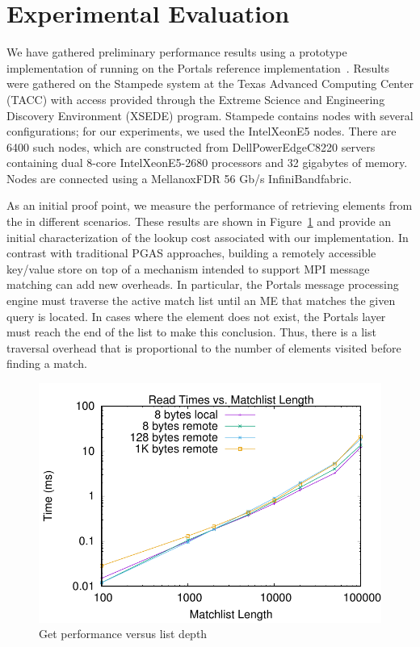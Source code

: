 \section{Experimental Evaluation}

We have gathered preliminary performance results using a prototype
implementation of \pdht running on the Portals reference
implementation~\cite{portals-code}.  Results were gathered on the Stampede
system at the Texas Advanced Computing Center (TACC) with access provided
through the Extreme Science and Engineering Discovery Environment (XSEDE)
program.  Stampede contains nodes with several configurations; for our
experiments, we used the Intel\regtm Xeon\regtm E5 nodes.  There are 6400 such
nodes, which are constructed from Dell\othertm PowerEdge\othertm C8220 servers
containing dual 8-core Intel\regtm Xeon\regtm E5-2680 processors and 32
gigabytes of memory.  Nodes are connected using a Mellanox\othertm FDR 56 Gb/s
InfiniBand\othertm fabric.

As an initial proof point, we measure the performance of retrieving elements
from the \pdht in different scenarios.  These results are shown in
Figure~\ref{fig:mlen} and provide an initial characterization of the lookup
cost associated with our \pdht implementation.  In contrast with traditional
PGAS approaches, building a remotely accessible key/value store on top of a
mechanism intended to support MPI message matching can add new overheads.  In
particular, the Portals message processing engine must traverse the active
match list until an ME that matches the given query is located.  In cases where
the element does not exist, the Portals layer must reach the end of the list to
make this conclusion.  Thus, there is a list traversal overhead that is
proportional to the number of elements visited before finding a match.

\begin{figure}
    \centering
    \includegraphics[width=\linewidth]{plots/mlen}
    \caption{Get performance versus list depth}
    \label{fig:mlen}
\end{figure}

